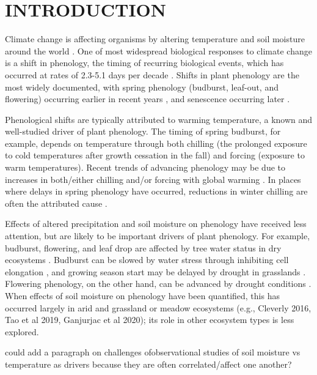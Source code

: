 \documentclass{article}
\begin{document}
\section* {INTRODUCTION}
\par Climate change is affecting organisms by altering temperature and soil moisture around the world \citep{parmesan2006,chen2011}. One of most widespread biological responses to climate change is a shift in phenology, the timing of recurring biological events, which has occurred at rates of 2.3-5.1 days per decade \citep{parmesan2006,poloczanska2013,root2003}. Shifts in plant phenology are the most widely documented, with spring phenology (budburst, leaf-out, and flowering) occurring earlier in recent years \citep{wolkovich2012}, and senescence occurring later \citep{taylor2008,delpierre2009}. 
\par Phenological shifts are typically attributed to warming temperature, a known and well-studied driver of plant phenology. The timing of spring budburst, for example, depends on temperature through both chilling (the prolonged exposure to cold temperatures after growth cessation in the fall) and forcing (exposure to warm temperatures). Recent trends of advancing phenology may be due to increases in both/either chilling and/or forcing with global warming \citep{fujisawa2010, ibanez2010,cook2012b}. In places where delays in spring phenology have occurred, reductions in winter chilling are often the attributed cause \citep{yu2010}. 
\par Effects of altered precipitation and soil moisture on phenology have received less attention, but are likely to be important drivers of plant phenology. For example, budburst, flowering, and leaf drop are affected by tree water status in dry ecosystems \citep[e.g., ][]{essiamah1986,reich1984, van1993}. Budburst can be slowed by water stress through inhibiting cell elongation \citep{essiamah1986}, and growing season start may be delayed by drought in grasslands \cite{cui2017}. Flowering phenology, on the other hand, can be advanced by drought conditions \citep{hamann2018}. When effects of soil moisture on phenology have been quantified, this has occurred largely in arid and grassland or meadow ecosystems (e.g., Cleverly 2016, Tao et al 2019, Ganjurjac et al 2020); its role in other ecosystem types is less explored.
\par could add a paragraph on challenges ofobservational studies of soil moisture vs temperature as drivers because they are often correlated/affect one another?
\end{document}
